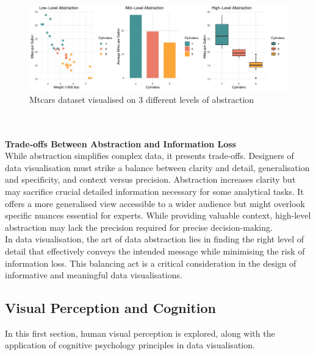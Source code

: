 \documentclass{article}\usepackage[]{graphicx}\usepackage[]{xcolor}
\makeatletter
\def\maxwidth{ %
  \ifdim\Gin@nat@width>\linewidth
    \linewidth
  \else
    \Gin@nat@width
  \fi
}
\newenvironment{knitrout}{}{} %
\makeatother
\begin{document}
\begin{knitrout}\scriptsize
{}\color{fgcolor}\begin{figure}[H]

{\centering \includegraphics[width=\maxwidth]{figure/beamer-abs-plots-1} 

}

\caption[Mtcars dataset visualised on 3 different levels of abstraction]{Mtcars dataset visualised on 3 different levels of abstraction}\label{fig:abs-plots}
\end{figure}

\end{knitrout}
\\
\\
\noindent \textbf{Trade-offs Between Abstraction and Information Loss}\\
While abstraction simplifies complex data, it presents trade-offs. Designers of data visualisation must strike a balance between clarity and detail, generalisation and specificity, and context versus precision. Abstraction increases clarity but may sacrifice crucial detailed information necessary for some analytical tasks. It offers a more generalised view accessible to a wider audience but might overlook specific nuances essential for experts. While providing valuable context, high-level abstraction may lack the precision required for precise decision-making.\\ 

\noindent 
In data visualisation, the art of data abstraction lies in finding the right level of detail that effectively conveys the intended message while minimising the risk of information loss. This balancing act is a critical consideration in the design of informative and meaningful data visualisations.

\subsection{Visual Perception and Cognition}
In this first section, human visual perception is explored, along with the application of cognitive psychology principles in data visualisation.\\ 
\end{document}

